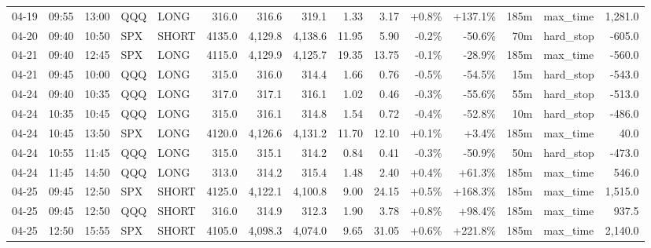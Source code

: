 \documentclass[11pt,a4paper,twoside]{article}
\begin{document}
\begin{landscape}
\begin{center}
\begin{longtable}{>{\color{txtmain}}l l l l l r r r r r r r r >{\color{txtmain}}l r}
04-19 & 09:55 & 13:00 & QQQ & LONG & 316.0 & 316.6 & 319.1 & 1.33 & 3.17 & \textcolor{wingreen}{+0.8\%} & \textcolor{wingreen}{+137.1\%} & 185m & max\_time & \textcolor{wingreen}{1,281.0} \\
04-20 & 09:40 & 10:50 & SPX & SHORT & 4135.0 & 4,129.8 & 4,138.6 & 11.95 & 5.90 & \textcolor{lossred}{-0.2\%} & \textcolor{lossred}{-50.6\%} & 70m & hard\_stop & \textcolor{lossred}{-605.0} \\
04-21 & 09:40 & 12:45 & SPX & LONG & 4115.0 & 4,129.9 & 4,125.7 & 19.35 & 13.75 & \textcolor{lossred}{-0.1\%} & \textcolor{lossred}{-28.9\%} & 185m & max\_time & \textcolor{lossred}{-560.0} \\
04-21 & 09:45 & 10:00 & QQQ & LONG & 315.0 & 316.0 & 314.4 & 1.66 & 0.76 & \textcolor{lossred}{-0.5\%} & \textcolor{lossred}{-54.5\%} & 15m & hard\_stop & \textcolor{lossred}{-543.0} \\
04-24 & 09:40 & 10:35 & QQQ & LONG & 317.0 & 317.1 & 316.1 & 1.02 & 0.46 & \textcolor{lossred}{-0.3\%} & \textcolor{lossred}{-55.6\%} & 55m & hard\_stop & \textcolor{lossred}{-513.0} \\
04-24 & 10:35 & 10:45 & QQQ & LONG & 315.0 & 316.1 & 314.8 & 1.54 & 0.72 & \textcolor{lossred}{-0.4\%} & \textcolor{lossred}{-52.8\%} & 10m & hard\_stop & \textcolor{lossred}{-486.0} \\
04-24 & 10:45 & 13:50 & SPX & LONG & 4120.0 & 4,126.6 & 4,131.2 & 11.70 & 12.10 & \textcolor{wingreen}{+0.1\%} & \textcolor{wingreen}{+3.4\%} & 185m & max\_time & \textcolor{wingreen}{40.0} \\
04-24 & 10:55 & 11:45 & QQQ & LONG & 315.0 & 315.1 & 314.2 & 0.84 & 0.41 & \textcolor{lossred}{-0.3\%} & \textcolor{lossred}{-50.9\%} & 50m & hard\_stop & \textcolor{lossred}{-473.0} \\
04-24 & 11:45 & 14:50 & QQQ & LONG & 313.0 & 314.2 & 315.4 & 1.48 & 2.40 & \textcolor{wingreen}{+0.4\%} & \textcolor{wingreen}{+61.3\%} & 185m & max\_time & \textcolor{wingreen}{546.0} \\
04-25 & 09:45 & 12:50 & SPX & SHORT & 4125.0 & 4,122.1 & 4,100.8 & 9.00 & 24.15 & \textcolor{wingreen}{+0.5\%} & \textcolor{wingreen}{+168.3\%} & 185m & max\_time & \textcolor{wingreen}{1,515.0} \\
04-25 & 09:45 & 12:50 & QQQ & SHORT & 316.0 & 314.9 & 312.3 & 1.90 & 3.78 & \textcolor{wingreen}{+0.8\%} & \textcolor{wingreen}{+98.4\%} & 185m & max\_time & \textcolor{wingreen}{937.5} \\
04-25 & 12:50 & 15:55 & SPX & SHORT & 4105.0 & 4,098.3 & 4,074.0 & 9.65 & 31.05 & \textcolor{wingreen}{+0.6\%} & \textcolor{wingreen}{+221.8\%} & 185m & max\_time & \textcolor{wingreen}{2,140.0} \\

\end{longtable}
\end{center}
\end{landscape}
\end{document}
